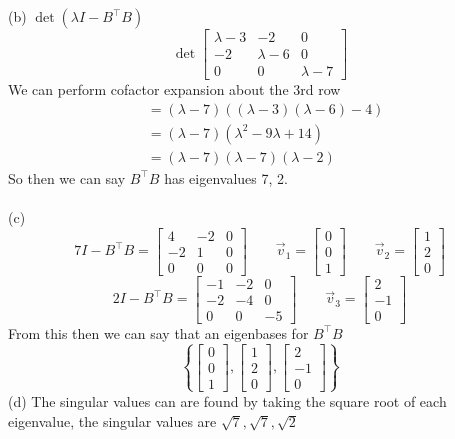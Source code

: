 \documentclass{report}
\begin{document}
(b) $\det(\lambda I - B^\top B)$
$$
\det\begin{bmatrix}
\lambda-3&-2&0\\
-2&\lambda-6&0\\
0&0&\lambda-7
\end{bmatrix}
$$
We can perform cofactor expansion about the 3rd row
$$
\begin{aligned}
&=(\lambda-7)((\lambda-3)(\lambda-6)-4)\\
&=(\lambda-7)(\lambda^2-9\lambda+14)\\
&=(\lambda-7)(\lambda-7)(\lambda-2)
\end{aligned}
$$
So then we can say $B^\top B$ has eigenvalues 7, 2.\\
\\
\noindent(c)
$$
7I - B^\top B = \begin{bmatrix}
4&-2&0\\
-2&1&0\\
0&0&0
\end{bmatrix}\qquad\vec{v}_1=\begin{bmatrix}0\\0\\1\end{bmatrix}\qquad\vec{v}_2=\begin{bmatrix}1\\2\\0\end{bmatrix}
$$
$$
2I- B^\top B = \begin{bmatrix}
-1&-2&0\\
-2&-4&0\\
0&0&-5
\end{bmatrix}\qquad\vec{v}_3=\begin{bmatrix}2\\-1\\0\end{bmatrix}
$$
From this then we can say that an eigenbases for $B^\top B$
$$
\left\{
\begin{bmatrix}0\\0\\1\end{bmatrix},
\begin{bmatrix}1\\2\\0\end{bmatrix},
\begin{bmatrix}2\\-1\\0\end{bmatrix}
\right\}
$$
(d) The singular values can are found by taking the square root of each eigenvalue, the singular values are $\sqrt{7}, \sqrt{7}, \sqrt{2}$\\
\end{document}
